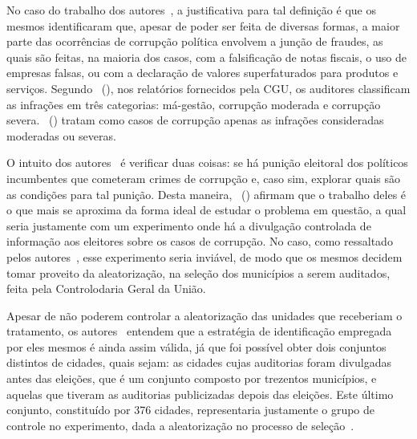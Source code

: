 \documentclass[
	12pt,				%
	openright,			%
	twoside,			%
	a4paper,			%
	openany,
	english,			%
	brazil				%
	]{abntex2}
\begin{document}
No caso do trabalho dos autores~\cite{ferraz2008exposing}, a justificativa para tal definição é que os mesmos identificaram que, apesar de poder ser feita de diversas formas, a maior parte das ocorrências de corrupção política envolvem a junção de fraudes, as quais são feitas, na maioria dos casos, com a falsificação de notas fiscais, o uso de empresas falsas, ou com a declaração de valores superfaturados para produtos e serviços. Segundo ~(\citeyear{Avis2018Oct}), nos relatórios fornecidos pela CGU, os auditores classificam as infrações em três categorias: má-gestão, corrupção moderada e corrupção severa. ~(\citeyear{ferraz2008exposing}) tratam como casos de corrupção apenas as infrações consideradas moderadas ou severas.

O intuito dos autores~\cite{ferraz2008exposing} é verificar duas coisas: se há punição eleitoral dos políticos incumbentes que cometeram crimes de corrupção e, caso sim, explorar quais são as condições para tal punição. Desta maneira, ~(\citeyear{ferraz2008exposing}) afirmam que o trabalho deles é o que mais se aproxima da forma ideal de estudar o problema em questão, a qual seria justamente com um experimento onde há a divulgação controlada de informação aos eleitores sobre os casos de corrupção. No caso, como ressaltado pelos autores~\cite{ferraz2008exposing}, esse experimento seria inviável, de modo que os mesmos decidem tomar proveito da aleatorização, na seleção dos municípios a serem auditados, feita pela Controlodaria Geral da União.

Apesar de não poderem controlar a aleatorização das unidades que receberiam o tratamento, os autores~\cite{ferraz2008exposing} entendem que a estratégia de identificação empregada por eles mesmos é ainda assim válida, já que foi possível obter dois conjuntos distintos de cidades, quais sejam: as cidades cujas auditorias foram divulgadas antes das eleições, que é um conjunto composto por trezentos municípios, e aquelas que tiveram as auditorias publicizadas depois das eleições. Este último conjunto, constituído por 376 cidades, representaria justamente o grupo de controle no experimento, dada a aleatorização no processo de seleção~\cite{ferraz2008exposing}.

\end{document}
